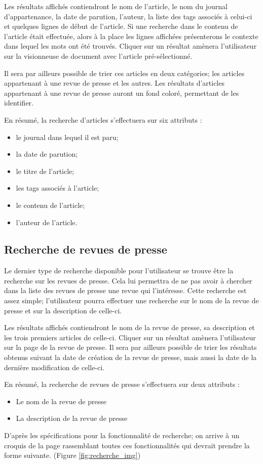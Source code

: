 Les résultats affichés contiendront le nom de l'article, le nom du journal d'appartenance, la date de parution, l'auteur, la liste des tags associés à celui-ci et quelques lignes de début de l'article. Si une recherche dans le contenu de l'article était effectuée, alors à la place les lignes affichées présenterons le contexte dans lequel les mots ont été trouvés. Cliquer sur un résultat amènera l'utilisateur sur la visionneuse de document avec l'article pré-sélectionné.

Il sera par ailleurs possible de trier ces articles en deux catégories; les articles appartenant à une revue de presse et les autres. Les résultats d'articles appartenant à une revue de presse auront un fond coloré, permettant de les identifier.

En résumé, la recherche d'articles s'effectuera sur six attributs :
\begin{itemize}
	\item le journal dans lequel il est paru;
	\item la date de parution;
	\item le titre de l'article;
	\item les tags associés à l'article;
	\item le contenu de l'article;
	\item l'auteur de l'article.
\end{itemize}

\subsection{Recherche de revues de presse}
\label{sec:recherche_revue}

Le dernier type de recherche disponible pour l'utilisateur se trouve être la recherche sur les revues de presse. Cela lui permettra de ne pas avoir à chercher dans la liste des revues de presse une revue qui l'intéresse. Cette recherche est assez simple; l'utilisateur pourra effectuer une recherche sur le nom de la revue de presse et sur la description de celle-ci.

Les résultats affichés contiendront le nom de la revue de presse, sa description et les trois premiers articles de celle-ci. Cliquer sur un résultat amènera l'utilisateur sur la page de la revue de presse. Il sera par ailleurs possible de trier les résultats obtenus suivant la date de création de la revue de presse, mais aussi la date de la dernière modification de celle-ci.

En résumé, la recherche de revues de presse s'effectuera sur deux attributs :
\begin{itemize}
	\item Le nom de la revue de presse
	\item La description de la revue de presse
\end{itemize}
\bigskip
\par
D'après les spécifications pour la fonctionnalité de recherche; on arrive à un croquis de la page rassemblant toutes ces fonctionnalités qui devrait prendre la forme suivante. (Figure \ref{fig:recherche_img})

